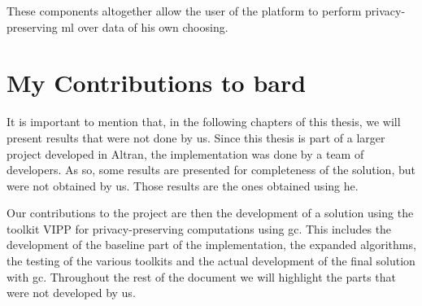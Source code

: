 These components altogether allow the user of the platform to perform privacy-preserving \ac{ml} over data of his own choosing. 






\section{My Contributions to \ac{bard}}
\label{sec:MyContributions}

It is important to mention that, in the following chapters of this thesis, we will present results that were not done by us. Since this thesis is part of a larger project developed in Altran, the implementation was done by a team of developers. As so, some results are presented for completeness of the solution, but were not obtained by us. Those results are the ones obtained using \ac{he}.

Our contributions to the project are then the development of a solution using the toolkit VIPP for privacy-preserving computations using \ac{gc}. This includes the development of the baseline part of the implementation, the expanded algorithms, the testing of the various toolkits and the actual development of the final solution with \ac{gc}. Throughout the rest of the document we will highlight the parts that were not developed by us. 

